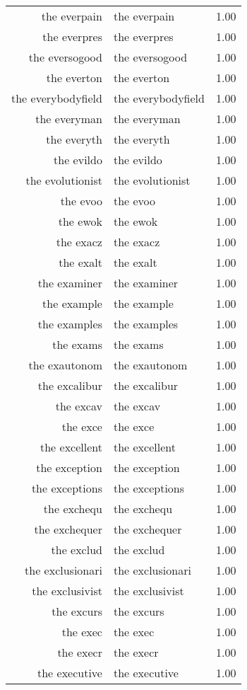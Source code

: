 \begin{table}[ht]
\begin{tabular}{rlr}
  the everpain & the everpain & 1.00 \\ 
  the everpres & the everpres & 1.00 \\ 
  the eversogood & the eversogood & 1.00 \\ 
  the everton & the everton & 1.00 \\ 
  the everybodyfield & the everybodyfield & 1.00 \\ 
  the everyman & the everyman & 1.00 \\ 
  the everyth & the everyth & 1.00 \\ 
  the evildo & the evildo & 1.00 \\ 
  the evolutionist & the evolutionist & 1.00 \\ 
  the evoo & the evoo & 1.00 \\ 
  the ewok & the ewok & 1.00 \\ 
  the exacz & the exacz & 1.00 \\ 
  the exalt & the exalt & 1.00 \\ 
  the examiner & the examiner & 1.00 \\ 
  the example & the example & 1.00 \\ 
  the examples & the examples & 1.00 \\ 
  the exams & the exams & 1.00 \\ 
  the exautonom & the exautonom & 1.00 \\ 
  the excalibur & the excalibur & 1.00 \\ 
  the excav & the excav & 1.00 \\ 
  the exce & the exce & 1.00 \\ 
  the excellent & the excellent & 1.00 \\ 
  the exception & the exception & 1.00 \\ 
  the exceptions & the exceptions & 1.00 \\ 
  the exchequ & the exchequ & 1.00 \\ 
  the exchequer & the exchequer & 1.00 \\ 
  the exclud & the exclud & 1.00 \\ 
  the exclusionari & the exclusionari & 1.00 \\ 
  the exclusivist & the exclusivist & 1.00 \\ 
  the excurs & the excurs & 1.00 \\ 
  the exec & the exec & 1.00 \\ 
  the execr & the execr & 1.00 \\ 
  the executive & the executive & 1.00 \\ 

\end{tabular}
\end{table}
